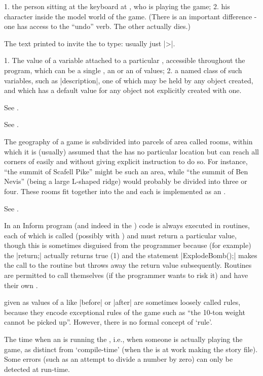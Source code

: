 {{{%
1. the person sitting at the keyboard at , who is playing
the game; 2. his character inside the model world of the game.  (There is an
important difference - one has access to the ``undo'' verb.  The other
actually dies.)

%
The text printed to invite the  to type: usually just |>|.

%
1. The value of a variable attached to a particular , accessible
throughout the program, which can be a single , an  or an  of values; 2. a named class of such variables,
such as |description|, one of which may be held by any object created, and
which has a default value for any object not explicitly created with one.

%
See .

%
See .

%
The geography of a game is subdivided into parcels of area called rooms,
within which it is (usually) assumed that the  has no particular
location but can reach all corners of easily and without giving explicit
instruction to do so.  For instance, ``the summit of Scafell Pike'' might be
such an area, while ``the summit of Ben Nevis'' (being a large L-shaped
ridge) would probably be divided into three or four.  These rooms fit
together into the  and each is implemented as an .

%
See .

%
In an Inform program (and indeed in the ) code is always
executed in routines, each of which is called (possibly with )
and must return a particular  value, though this is sometimes
disguised from the programmer because (for example) the 
|return;| actually returns true (1) and the statement |ExplodeBomb();| 
makes the call to the routine but throws away the return value subsequently.
Routines are permitted to call themselves (if the programmer wants to
risk it) and have their own .

%
 given as values of a  like |before| or
|after| are sometimes loosely called rules, because they encode exceptional
rules of the game such as ``the 10-ton weight cannot be picked up''. 
However, there is no formal concept of `rule'.

%
The time when an  is running the , i.e., when
someone is actually playing the game, as distinct from `compile-time' (when
the  is at work making the story file).  Some errors (such as
an attempt to divide a number by zero) can only be detected at run-time.

}}}
